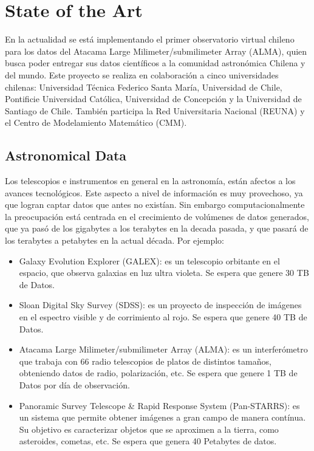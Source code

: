 \section{State of the Art}

En la actualidad se está implementando el primer observatorio virtual chileno
para los datos del Atacama Large Milimeter/submilimeter Array (ALMA), quien
busca poder entregar sus datos científicos a la comunidad astronómica Chilena y
del mundo. Este proyecto se realiza en colaboración a cinco universidades
chilenas: Universidad Técnica Federico Santa María, Universidad de Chile,
Pontificie Universidad Católica, Universidad de Concepción y la Universidad de
Santiago de Chile. También participa la Red Universitaria Nacional (REUNA) y el
Centro de Modelamiento Matemático (CMM).

\subsection{Astronomical Data}
Los telescopios e instrumentos en general en la astronomía, están afectos a los
avances tecnológicos. Este aspecto a nivel de información es muy provechoso, ya
que logran captar datos que antes no existían. Sin embargo computacionalmente
la preocupación está centrada en el crecimiento de volúmenes de datos generados, que ya pasó de los gigabytes a
los terabytes en la decada pasada, y que pasará de los terabytes a petabytes en
la actual década. Por ejemplo:
\begin{itemize}
	\item Galaxy Evolution Explorer (GALEX): es un telescopio orbitante en
el espacio, que observa galaxias en luz ultra violeta. Se espera que genere 30
TB de Datos.
	\item Sloan Digital Sky Survey (SDSS): es un proyecto de inspección de
imágenes en el espectro visible y de corrimiento al rojo. Se espera que genere
40 TB de Datos.
	\item Atacama Large Milimeter/submilimeter Array (ALMA): es un
interferómetro que trabaja con 66 radio telescopios de platos de distintos
tamaños, obteniendo datos de radio, polarización, etc. Se espera que genere 1
TB de Datos por día de observación.
	\item Panoramic Survey Telescope \& Rapid Response System (Pan-STARRS):
es un sistema que permite obtener imágenes a gran campo de manera contínua. Su
objetivo es caracterizar objetos que se aproximen a la tierra, como asteroides,
cometas, etc. Se espera que genera 40 Petabytes de datos.
\end{itemize}

